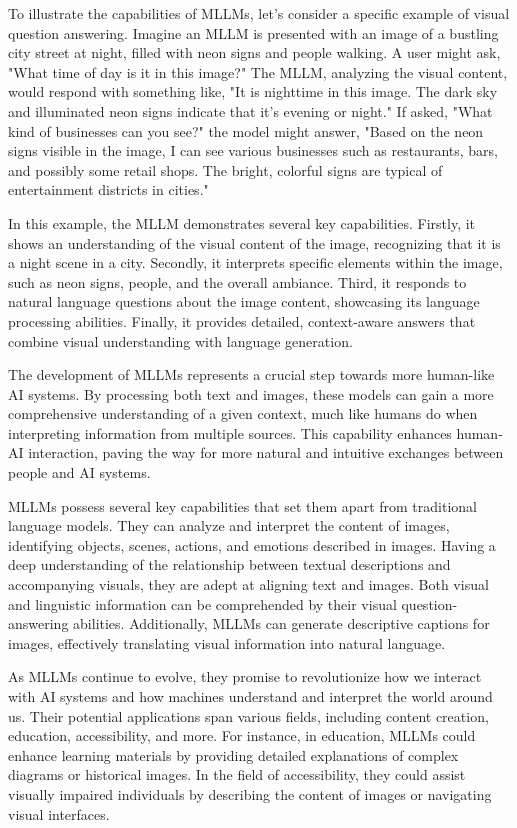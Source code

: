 To illustrate the capabilities of MLLMs, let's consider a specific example of visual question answering. Imagine an MLLM is presented with an image of a bustling city street at night, filled with neon signs and people walking. A user might ask, "What time of day is it in this image?" The MLLM, analyzing the visual content, would respond with something like, "It is nighttime in this image. The dark sky and illuminated neon signs indicate that it's evening or night." If asked, "What kind of businesses can you see?" the model might answer, "Based on the neon signs visible in the image, I can see various businesses such as restaurants, bars, and possibly some retail shops. The bright, colorful signs are typical of entertainment districts in cities."

In this example, the MLLM demonstrates several key capabilities. Firstly, it shows an understanding of the visual content of the image, recognizing that it is a night scene in a city. Secondly, it interprets specific elements within the image, such as neon signs, people, and the overall ambiance. Third, it responds to natural language questions about the image content, showcasing its language processing abilities. Finally, it provides detailed, context-aware answers that combine visual understanding with language generation.

The development of MLLMs represents a crucial step towards more human-like AI systems. By processing both text and images, these models can gain a more comprehensive understanding of a given context, much like humans do when interpreting information from multiple sources. This capability enhances human-AI interaction, paving the way for more natural and intuitive exchanges between people and AI systems.

MLLMs possess several key capabilities that set them apart from traditional language models. They can analyze and interpret the content of images, identifying objects, scenes, actions, and emotions described in images. Having a deep understanding of the relationship between textual descriptions and accompanying visuals, they are adept at aligning text and images. Both visual and linguistic information can be comprehended by their visual question-answering abilities. Additionally, MLLMs can generate descriptive captions for images, effectively translating visual information into natural language.

As MLLMs continue to evolve, they promise to revolutionize how we interact with AI systems and how machines understand and interpret the world around us. Their potential applications span various fields, including content creation, education, accessibility, and more. For instance, in education, MLLMs could enhance learning materials by providing detailed explanations of complex diagrams or historical images. In the field of accessibility, they could assist visually impaired individuals by describing the content of images or navigating visual interfaces.


